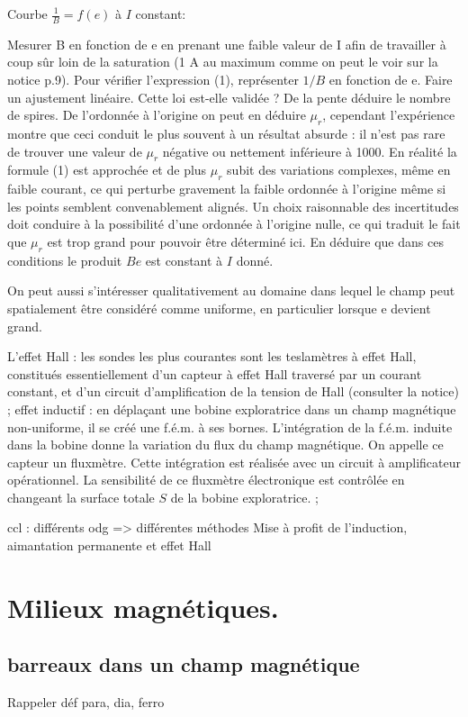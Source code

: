 \documentclass{article}%
\begin{document}
Courbe $\frac{1}{B} = f(e)$ à $I$ constant:

Mesurer B en fonction de e en prenant une faible valeur de I afin de travailler à coup sûr loin de la saturation (1 A au maximum comme on peut le voir sur la notice p.9).
Pour vérifier l'expression (1), représenter $1/B$ en fonction de e. Faire un ajustement linéaire. Cette loi est-elle validée ? De la pente déduire le nombre de spires.
De l'ordonnée à l'origine on peut en déduire $\mu_r$, cependant l'expérience montre que ceci conduit le plus souvent à un résultat absurde : il n'est pas rare de trouver une valeur de $\mu_r$ négative ou nettement inférieure à 1000. En réalité la formule (1) est approchée et de plus $\mu_r$ subit des variations complexes, même en faible courant, ce qui perturbe gravement la faible ordonnée à l'origine même si les points semblent convenablement alignés. Un choix raisonnable des incertitudes doit conduire à la possibilité d'une ordonnée à l'origine nulle, ce qui traduit le fait que $\mu_r$ est trop grand pour pouvoir être déterminé ici. En déduire que dans ces conditions le produit $Be$ est constant à $I$ donné.

On peut aussi s'intéresser qualitativement au domaine dans lequel le champ peut spatialement être considéré comme uniforme, en particulier lorsque e devient grand. 

L'effet Hall : les sondes les plus courantes sont les teslamètres à effet Hall, constitués essentiellement d'un capteur à effet Hall traversé par un courant constant, et d'un circuit d'amplification de la tension de Hall (consulter la notice) ;
effet inductif : en déplaçant une bobine exploratrice dans un champ magnétique non-uniforme, il se créé une f.é.m. à ses bornes. L'intégration de la f.é.m. induite dans la bobine donne la variation du flux du champ magnétique. On appelle ce capteur un fluxmètre. Cette intégration est réalisée avec un circuit à amplificateur opérationnel. La sensibilité de ce fluxmètre électronique est contrôlée en changeant la surface totale $ S $ de la bobine exploratrice. ;

ccl : différents odg => différentes méthodes
Mise à profit de l'induction, aimantation permanente et effet Hall

\section{Milieux magnétiques.}
\subsection{barreaux dans un champ magnétique}
Rappeler déf para, dia, ferro
\end{document}
